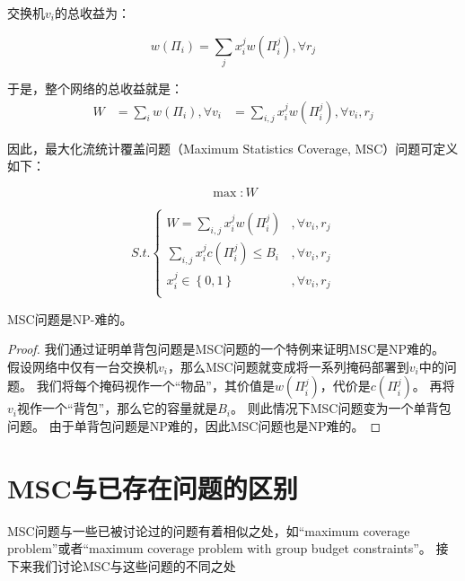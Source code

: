 交换机$v_i$的总收益为：

\begin{equation}
    w(\Pi_i) = \sum_{j} x_i^j w(\Pi^j_i), \forall r_j
\end{equation}

于是，整个网络的总收益就是：
\begin{equation}
\begin{aligned}
    W &= \sum_i w(\Pi_i), \forall v_i
      &= \sum_{i,j} x_i^j w(\Pi^j_i), \forall v_i,r_j
\end{aligned}
\end{equation}

因此，最大化流统计覆盖问题（Maximum Statistics Coverage, MSC）问题可定义如下：

\begin{equation*}
\max :  W
\end{equation*}

\begin{equation}\label{eq:msc}
{S.t.}
\begin{cases}
W = \sum_{i,j} x_i^j w(\Pi^j_i) &, \forall v_i,r_j\\
\sum_{i,j} x_i^j c(\Pi^j_i) \le B_i &, \forall v_i,r_j   \\
x^j_{i}\in \left\{ {0,1} \right\} &,   \forall v_i,r_j  \\
\end{cases}
\end{equation}

\begin{theorem}\label{thm:nphard}
    MSC问题是NP-难的。
\end{theorem}

\begin{proof}
我们通过证明单背包问题\cite{ingargiola1973reduction}是MSC问题的一个特例来证明MSC是NP难的。
假设网络中仅有一台交换机$v_i$，那么MSC问题就变成将一系列掩码部署到$v_i$中的问题。
我们将每个掩码视作一个“物品”，其价值是$w(\Pi^j_i)$，代价是$c(\Pi^j_i)$。
再将$v_i$视作一个“背包”，那么它的容量就是$B_i$。
则此情况下MSC问题变为一个单背包问题。
由于单背包问题是NP难的\cite{ingargiola1973reduction}，因此MSC问题也是NP难的。
\end{proof}


\section{MSC与已存在问题的区别}\label{sec:differenceproblem}

MSC问题与一些已被讨论过的问题有着相似之处，如“maximum coverage problem”\cite{khuller1999budgeted}或者“maximum coverage problem with group budget constraints”\cite{chekuri2004maximum}。
接下来我们讨论MSC与这些问题的不同之处

